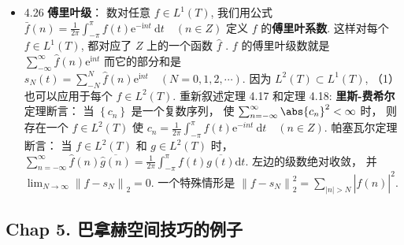 \begin{itemize}
\item 4.26 \textbf{傅里叶级}： 数对任意 $f \in L^{1}(T)$, 我们用公式 $\bar{f}(n)=\frac{1}{2 \pi} \int_{-\pi}^{\pi} f(t) \mathrm{e}^{-\mathrm{i} n t} \mathrm{~d} t \quad(n \in Z)$ 定义 $f$ 的\textbf{傅里叶系数}. 这样对每个 $f \in L^{1}(T)$, 都对应了 $Z$ 上的一个函数 $\hat{f}$ . $f$ 的傅里叶级数就是 $\sum_{-\infty}^{\infty} \hat{f}(n) \mathrm{e}^{\mathrm{i} n t}$ 而它的部分和是 $s_{N}(t)=\sum_{-N}^{N} \hat{f}(n) \mathrm{e}^{\mathrm{i} n t} \quad(N=0,1,2, \cdots)$. 因为 $L^{2}(T) \subset L^{1}(T)$, （1）也可以应用于每个 $f \in L^{2}(T)$. 重新叙述定理 4.17 和定理 4.18:
\textbf{里斯-费希尔}定理断言： 当 $\left\{c_{n}\right\}$ 是一个复数序列， 使 $\sum_{n=-\infty}^{\infty} \abs{c_n}^2 < \infty$ 时， 则存在一个 $f \in L^{2}(T)$ 使 $c_{n}=\frac{1}{2 \pi} \int_{-\pi}^{\pi} f(t) \mathrm{e}^{-i n t} \mathrm{~d} t \quad(n \in Z)$. 帕塞瓦尔定理断言： 当 $f \in L^{2}(T)$ 和 $g \in L^{2}(T)$ 时， $\sum_{n=-\infty}^{\infty} \hat{f}(n) \overline{\hat{g}(n)}=\frac{1}{2 \pi} \int_{-\pi}^{\pi} f(t) \overline{g(t)} \mathrm{d} t$. 
左边的级数绝对收敛， 并 $\lim _{N \rightarrow \infty}\left\|f-s_{N}\right\|_{2}=0$. 一个特殊情形是 $\left\|f-s_{N}\right\|_{2}^{2}=\sum_{|n|>N}|\hat{f}(n)|^{2}$.
\end{itemize}


\subsection{Chap 5. 巴拿赫空间技巧的例子}

